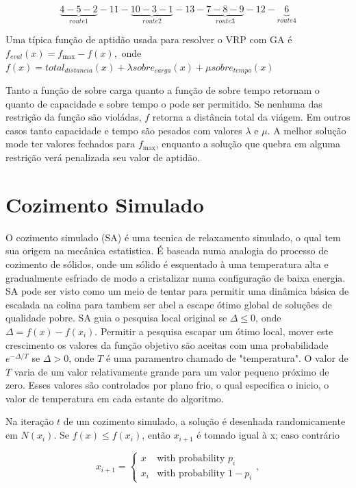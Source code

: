 \documentclass[a4paper, 12pt]{article}
\begin{document}
\[\underbrace{4-5-2}_{route1}-11-\underbrace{10-3-1}_{route2}-13-\underbrace{7-8-9}_{route3}-12-\underbrace{6}_{route4}\]



 Uma típica função de aptidão  usada para resolver o VRP com GA é $f_{eval}(x) = f_{\max}-f(x),$
onde $f(x)={total}_{distancia}(x)+\lambda sobre_{carga}(x)+ \mu sobre_{tempo}(x)$

 Tanto a função de sobre carga quanto a função de sobre tempo  retornam o quanto de capacidade e
sobre tempo o pode ser permitido. Se nenhuma das restrição da função são violádas, $f$ retorna a
distância total da viágem. Em outros casos tanto capacidade e tempo são pesados com valores
$\lambda$ e $\mu$. A melhor solução mode ter valores fechados para $f_{\max}$, enquanto a solução
que quebra em alguma restrição verá penalizada seu valor de aptidão.

\section{Cozimento Simulado}

 O cozimento simulado (SA) é uma tecnica de relaxamento simulado, o qual tem sua origem na mecânica
estatistica. É baseada numa analogia do processo de cozimento de sólidos, onde um sólido é
esquentado à uma temperatura alta e gradualmente esfriado de modo a cristalizar numa configuração de
baixa energia. SA pode ser visto como um meio de tentar para permitir uma dinâmica básica de
escalada na colina para tambem ser abel a escape ótimo global de soluções de qualidade pobre. SA
guia o pesquisa local original se $\Delta \leq 0$, onde $\Delta = f(x)-f(x_i)$. Permitir a pesquisa
escapar um ótimo local, mover este crescimento os valores da função objetivo são aceitas com uma
probabilidade $e^{-\Delta/T}$ se $\Delta > 0$, onde $T$ é uma paramentro chamado de "temperatura". O
valor de $T$ varia de um valor relativamente grande para um valor pequeno próximo de zero. Esses
valores são controlados por plano frio, o qual especifica o inicio, o valor de temperatura em cada
estante do algoritmo.

 Na iteração $t$ de um cozimento simulado, a solução é desenhada randomicamente em $N(x_i)$. Se
$f(x) \leq f(x_i)$, então $x_{i+1}$ é tomado igual à x; caso contrário

\[x_{i+1}=\begin{cases} 
x & \text{with probability } p_{i}\\ 
x_{i} & \text{with probability }1-p_{i} 
\end{cases},\]
\end{document}
